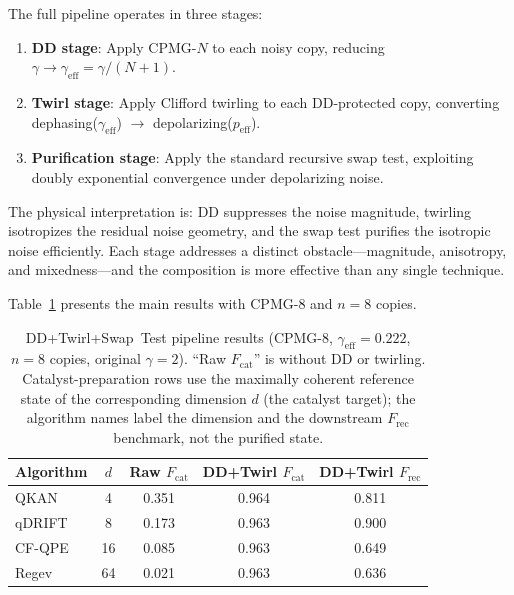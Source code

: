 \documentclass[a4paper,twocolumn]{quantumarticle}
\newenvironment{ruledtabular}{}{}%
\providecommand{\colrule}{\hline}
\begin{document}
The full pipeline operates in three stages:
\begin{enumerate}
\item \textbf{DD stage}: Apply CPMG-$N$ to each noisy copy, reducing $\gamma \to \gamma_\mathrm{eff} = \gamma/(N+1)$.
\item \textbf{Twirl stage}: Apply Clifford twirling to each DD-protected copy, converting dephasing($\gamma_\mathrm{eff}$) $\to$ depolarizing($p_\mathrm{eff}$).
\item \textbf{Purification stage}: Apply the standard recursive swap test, exploiting doubly exponential convergence under depolarizing noise.
\end{enumerate}

The physical interpretation is: DD suppresses the noise magnitude, twirling isotropizes the residual noise geometry, and the swap test purifies the isotropic noise efficiently.
Each stage addresses a distinct obstacle---magnitude, anisotropy, and mixedness---and the composition is more effective than any single technique.

Table~\ref{tab:dd_pipeline} presents the main results with CPMG-8 and $n = 8$ copies.

\begin{table}[tb]
\caption{DD+Twirl+Swap~Test pipeline results (CPMG-8, $\gamma_\mathrm{eff} = 0.222$, $n = 8$ copies, original $\gamma = 2$). ``Raw $F_\mathrm{cat}$'' is without DD or twirling. Catalyst-preparation rows use the maximally coherent reference state of the corresponding dimension $d$ (the catalyst target); the algorithm names label the dimension and the downstream $F_\mathrm{rec}$ benchmark, not the purified state.}
\label{tab:dd_pipeline}
\centering\footnotesize
\setlength{\tabcolsep}{3pt}
\begin{ruledtabular}
\begin{tabular}{lcccc}
Algorithm & $d$ & Raw $F_\mathrm{cat}$ & \makecell{DD+Twirl \\ $F_\mathrm{cat}$} & \makecell{DD+Twirl \\ $F_\mathrm{rec}$} \\
\colrule
QKAN & 4 & 0.351 & 0.964 & 0.811 \\
qDRIFT & 8 & 0.173 & 0.963 & 0.900 \\
CF-QPE & 16 & 0.085 & 0.963 & 0.649 \\
Regev & 64 & 0.021 & 0.963 & 0.636 \\
\end{tabular}
\end{ruledtabular}
\end{table}
\end{document}
